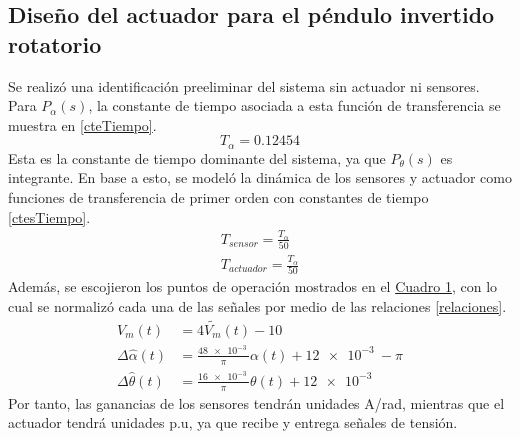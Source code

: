 \subsection{Diseño del actuador para el péndulo invertido rotatorio}
Se realizó una identificación preeliminar del sistema sin actuador ni sensores.
Para $P_{\alpha}(s)$, la constante de tiempo asociada a esta función de transferencia se muestra
en \eqref{cteTiempo}.
\begin{equation}
    T_{\alpha} = 0.12454 \label{cteTiempo}
\end{equation}
Esta es la constante de tiempo dominante del sistema, ya que $P_{\theta}(s)$ es integrante.
En base a esto, se modeló la dinámica de los sensores y actuador como funciones de transferencia
de primer orden con constantes de tiempo \eqref{ctesTiempo}.
\begin{equation}
    \begin{aligned}
        T_{sensor} = \frac{T_{\alpha}}{50}\label{ctesTiempo}\\
        T_{actuador} = \frac{T_{\alpha}}{50}
    \end{aligned}
\end{equation}
Además, se escojieron los puntos de operación mostrados en el \hyperref[t1]{Cuadro 1},
con lo cual se normalizó cada una de las señales por medio de las relaciones \eqref{relaciones}.
\begin{equation}
    \begin{aligned}
        V_m(t) &= 4\widetilde{V_m}(t) - 10\label{relaciones}\\
        \Delta\widehat{\alpha}(t) &= \frac{ \SI{48e-3}{}}{\pi}\alpha(t) + \SI{12e-3}{} -\pi\\
        \Delta\widehat{\theta}(t) &= \frac{ \SI{16e-3}{}}{\pi}\theta(t) + \SI{12e-3}{}
    \end{aligned}
\end{equation}
Por tanto, las ganancias de los sensores tendrán unidades A/rad, mientras que el actuador tendrá unidades p.u, ya 
que recibe y entrega señales de tensión.

